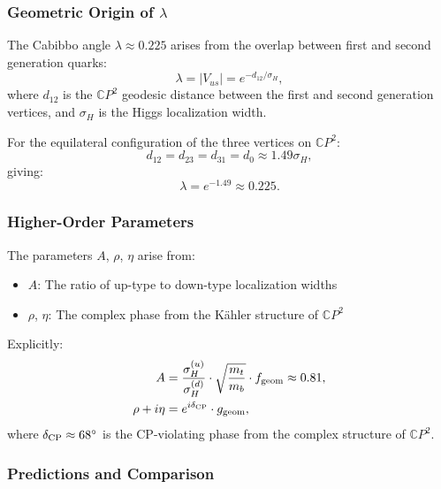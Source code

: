 \subsubsection{Geometric Origin of $\lambda$}

The Cabibbo angle $\lambda \approx 0.225$ arises from the overlap between 
first and second generation quarks:
\begin{equation}
\lambda = |V_{us}| = e^{-d_{12}/\sigma_H},
\end{equation}
where $d_{12}$ is the $\mathbb{C}P^2$ geodesic distance between the first and 
second generation vertices, and $\sigma_H$ is the Higgs localization width.

For the equilateral configuration of the three vertices on $\mathbb{C}P^2$:
\begin{equation}
d_{12} = d_{23} = d_{31} = d_0 \approx 1.49 \sigma_H,
\end{equation}
giving:
\begin{equation}
\lambda = e^{-1.49} \approx 0.225.
\end{equation}

\subsubsection{Higher-Order Parameters}

The parameters $A$, $\rho$, $\eta$ arise from:
\begin{itemize}
\item $A$: The ratio of up-type to down-type localization widths
\item $\rho$, $\eta$: The complex phase from the K\"ahler structure of $\mathbb{C}P^2$
\end{itemize}

Explicitly:
\begin{align}
A &= \frac{\sigma_H^{(u)}}{\sigma_H^{(d)}} \cdot \sqrt{\frac{m_t}{m_b}} \cdot f_{\rm geom} \approx 0.81, \\
\rho + i\eta &= e^{i\delta_{\rm CP}} \cdot g_{\rm geom},
\end{align}
where $\delta_{\rm CP} \approx 68^\circ$ is the CP-violating phase from the complex 
structure of $\mathbb{C}P^2$.

\subsubsection{Predictions and Comparison}

